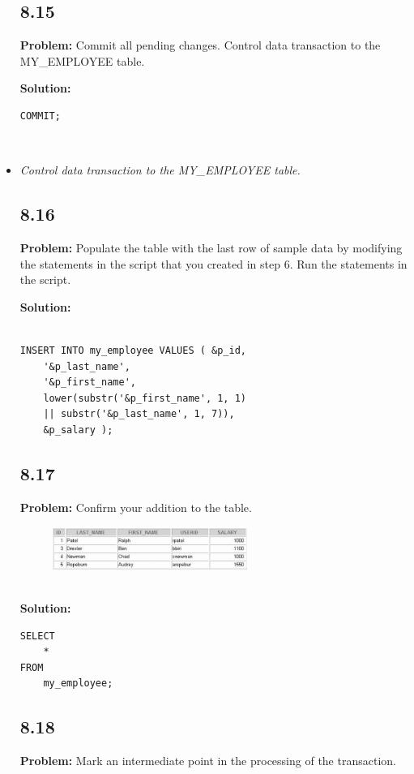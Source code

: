 \documentclass[12pt,a4paper]{article}
\begin{document}
\begin{itemize}
\subsection*{8.15}
\textbf{Problem:} Commit all pending changes. Control data transaction to the MY\_EMPLOYEE table.

\textbf{Solution:}
\begin{lstlisting}
COMMIT;
\end{lstlisting}\\
\newpage
\item \textit{Control data transaction to the MY\_EMPLOYEE table.}
\subsection*{8.16}
\textbf{Problem:} Populate the table with the last row of sample data by modifying the statements in the script that you created in step 6. Run the statements in the script.

\textbf{Solution:}
\begin{lstlisting}

INSERT INTO my_employee VALUES ( &p_id,
    '&p_last_name',
    '&p_first_name',
    lower(substr('&p_first_name', 1, 1)
    || substr('&p_last_name', 1, 7)),
    &p_salary );

\end{lstlisting}

\subsection*{8.17}
\textbf{Problem:} Confirm your addition to the table.
\\
\begin{figure}[htbp]
  \centering
  \includegraphics[width=0.6\textwidth]{Screenshots/817.png}
\end{figure}\\
\textbf{Solution:}
\begin{lstlisting}
SELECT 
    *
FROM
    my_employee;
\end{lstlisting}

\subsection*{8.18}
\textbf{Problem:} Mark an intermediate point in the processing of the transaction.


\end{itemize}
\end{document}
